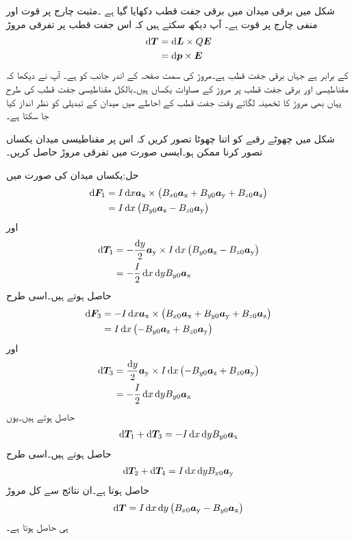 شکل  میں برقی میدان میں برقی جفت قطب دکھایا گیا ہے ۔مثبت چارج پر قوت  اور منفی چارج پر قوت    ہے۔ آپ دیکھ سکتے ہیں کہ اس جفت قطب پر  تفرقی مروڑ
\begin{align*}
\dif \kvec{T}&=\dif \kvec{L} \times Q \kvec{E}\\
&=\dif \kvec{p} \times \kvec{E}
\end{align*}
کے برابر ہے جہاں  برقی جفت قطب ہے۔مروڑ کی سمت صفحہ کے اندر جانب کو ہے۔ آپ نے دیکھا کہ مقناطیسی اور برقی جفت قطب پر مروڑ کے مساوات یکساں ہیں۔بالکل مقناطیسی جفت قطب کی طرح یہاں بھی مروڑ کا تخمینہ لگاتے وقت جفت قطب کے احاطے میں میدان  کے تبدیلی کو نظر انداز کیا جا سکتا ہے۔

شکل  میں چھوٹے رقبے کو اتنا چھوٹا تصور کریں کہ اس پر مقناطیسی میدان یکساں تصور کرنا ممکن ہو۔ایسی صورت میں تفرقی مروڑ حاصل کریں۔

حل:یکساں میدان کی صورت میں
\begin{align*}
\dif \kvec{F}_1&=I \dif x \ax \times \left(B_{x0} \ax+B_{y0}\ay+B_{z0}\az\right)\\
&=I \dif x \left(B_{y0}\az-B_{z0}\ay \right)
\end{align*}
اور
\begin{align*}
\dif \kvec{T}_1&=-\frac{\dif y}{2}\ay \times I \dif x \left(B_{y0}\az-B_{z0}\ay \right)\\
&=-\frac{I}{2} \dif x \dif y B_{y0}\ax
\end{align*}
حاصل ہوتے ہیں۔اسی طرح
\begin{align*}
\dif \kvec{F}_3&=-I \dif x \ax \times \left(B_{x0} \ax+B_{y0}\ay+B_{z0}\az\right)\\
&=I \dif x \left(-B_{y0}\az+B_{z0}\ay \right)
\end{align*}
اور
\begin{align*}
\dif \kvec{T}_3&=\frac{\dif y}{2}\ay \times I \dif x \left(-B_{y0}\az+B_{z0}\ay \right)\\
&=-\frac{I}{2} \dif x \dif y B_{y0}\ax
\end{align*}
حاصل ہوتے ہیں۔یوں
\begin{align*}
\dif \kvec{T}_1+\dif \kvec{T}_3=-I \dif x \dif y B_{y0}\ax
\end{align*}
حاصل ہوتے ہیں۔اسی طرح
\begin{align*}
\dif \kvec{T}_2+\dif \kvec{T}_4=I\dif x \dif y  B_{x0}\ay
\end{align*}
حاصل ہوتا ہے۔ان نتائج سے کل مروڑ
\begin{align*}
\dif \kvec{T}=I \dif x \dif y  \left(B_{x0}\ay -B_{y0}\ax\right) 
\end{align*}
ہی حاصل ہوتا ہے۔

